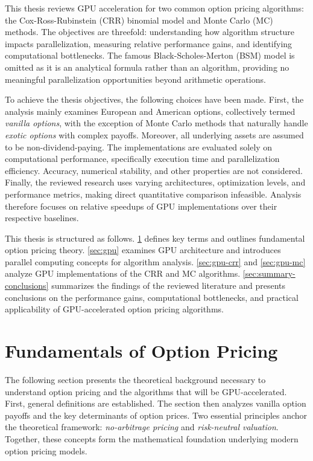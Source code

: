 \documentclass[english,12pt,a4paper,pdftex,sci,utf8]{aaltothesis}
\begin{document}
This thesis reviews GPU acceleration for two common option pricing algorithms: the Cox-Ross-Rubinstein (CRR) binomial model and Monte Carlo (MC) methods. The objectives are threefold: understanding how algorithm structure impacts parallelization, measuring relative performance gains, and identifying computational bottlenecks. The famous Black-Scholes-Merton (BSM) model is omitted as it is an analytical formula rather than an algorithm, providing no meaningful parallelization opportunities beyond arithmetic operations.

To achieve the thesis objectives, the following choices have been made. First, the analysis mainly examines European and American options, collectively termed \emph{vanilla options}, with the exception of Monte Carlo methods that naturally handle \emph{exotic options} with complex payoffs. Moreover, all underlying assets are assumed to be non-dividend-paying. The implementations are evaluated solely on computational performance, specifically execution time and parallelization efficiency. Accuracy, numerical stability, and other properties are not considered. Finally, the reviewed research uses varying architectures, optimization levels, and performance metrics, making direct quantitative comparison infeasible. Analysis therefore focuses on relative speedups of GPU implementations over their respective baselines.

This thesis is structured as follows. \cref{sec:theory} defines key terms and outlines fundamental option pricing theory. \cref{sec:gpu} examines GPU architecture and introduces parallel computing concepts for algorithm analysis. \cref{sec:gpu-crr} and \cref{sec:gpu-mc} analyze GPU implementations of the CRR and MC algorithms. \cref{sec:summary-conclusions} summarizes the findings of the reviewed literature and presents conclusions on the performance gains, computational bottlenecks, and practical applicability of GPU-accelerated option pricing algorithms.
\clearpage

\section{Fundamentals of Option Pricing} \label{sec:theory}

The following section presents the theoretical background necessary to understand option pricing and the algorithms that will be GPU-accelerated. First, general definitions are established. The section then analyzes vanilla option payoffs and the key determinants of option prices. Two essential principles anchor the theoretical framework: \emph{no-arbitrage pricing} and \emph{risk-neutral valuation}. Together, these concepts form the mathematical foundation underlying modern option pricing models.
\end{document}

